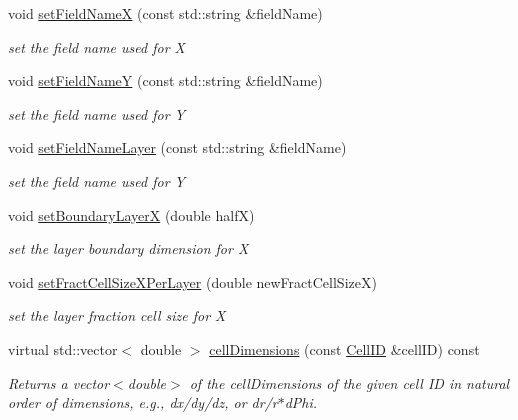 \begin{DoxyCompactItemize}
void \hyperlink{class_d_d4hep_1_1_d_d_segmentation_1_1_tiled_layer_grid_x_y_a1e0e7dc80968a2a7513cdd974275e5d5}{setFieldNameX} (const std::string \&fieldName)
\begin{DoxyCompactList}\small\item\em set the field name used for X \item\end{DoxyCompactList}\item 
void \hyperlink{class_d_d4hep_1_1_d_d_segmentation_1_1_tiled_layer_grid_x_y_a8e33e4196b585e5376e871818e784bfa}{setFieldNameY} (const std::string \&fieldName)
\begin{DoxyCompactList}\small\item\em set the field name used for Y \item\end{DoxyCompactList}\item 
void \hyperlink{class_d_d4hep_1_1_d_d_segmentation_1_1_tiled_layer_grid_x_y_a2bf0d13d0e1ea42c698c10339e220590}{setFieldNameLayer} (const std::string \&fieldName)
\begin{DoxyCompactList}\small\item\em set the field name used for Y \item\end{DoxyCompactList}\item 
void \hyperlink{class_d_d4hep_1_1_d_d_segmentation_1_1_tiled_layer_grid_x_y_a713a5e8262e11c1806893ead420f116d}{setBoundaryLayerX} (double halfX)
\begin{DoxyCompactList}\small\item\em set the layer boundary dimension for X \item\end{DoxyCompactList}\item 
void \hyperlink{class_d_d4hep_1_1_d_d_segmentation_1_1_tiled_layer_grid_x_y_a89afa525c07a985c490e593f84961d7c}{setFractCellSizeXPerLayer} (double newFractCellSizeX)
\begin{DoxyCompactList}\small\item\em set the layer fraction cell size for X \item\end{DoxyCompactList}\item 
virtual std::vector$<$ double $>$ \hyperlink{class_d_d4hep_1_1_d_d_segmentation_1_1_tiled_layer_grid_x_y_a5304d34d8b7bb2eb0a187a595796de31}{cellDimensions} (const \hyperlink{namespace_d_d4hep_1_1_d_d_segmentation_ac7af071d85cb48820914434a07e21ba1}{CellID} \&cellID) const 
\begin{DoxyCompactList}\small\item\em Returns a vector$<$double$>$ of the cellDimensions of the given cell ID in natural order of dimensions, e.g., dx/dy/dz, or dr/r$\ast$dPhi. \item\end{DoxyCompactList}\end{DoxyCompactItemize}
